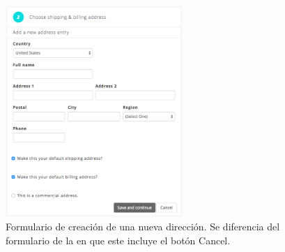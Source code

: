 	\begin{figure}[H]
		\centering
		\includegraphics[width=0.6\textwidth]{figuras/shipping/form_add_address.png}
		\caption{Formulario de creación de una nueva dirección. Se diferencia del formulario de la  en que este incluye el botón Cancel.}
		\label{figure:checkout:form_add_address}
	\end{figure}




	